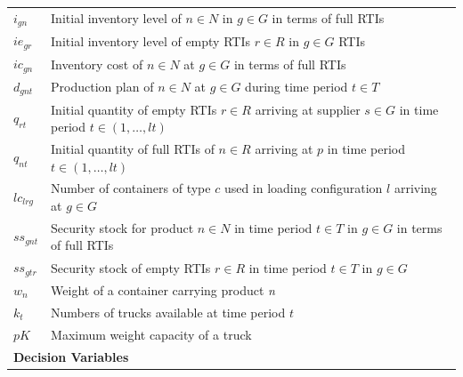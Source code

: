 \begin{longtable}[hbt!]{  |p{}|p{}  |}
  \textit{$i_{gn}$}  & Initial inventory level of $n\in N$ in $g \in G$ in terms of full RTIs                                                                            \\
  \textit{$ie_{gr}$} & Initial inventory level of empty RTIs $r\in R$ in $g \in G$ RTIs                                                                                  \\
  \textit{$ic_{gn}$} & Inventory cost of $n\in N$ at $g \in G$ in terms of full RTIs                                                                                     \\
  $d_{gnt}$          & Production plan of $n \in N$ at $g \in G$ during time period $t\in T$                                                                             \\
  $q_{rt}$           & Initial quantity of empty RTIs $r\in R$ arriving at supplier $s\in G$ in time period $t \in (1,\dots , lt)$                                       \\
  $q_{nt}$           & Initial quantity of full RTIs of $n \in R$ arriving at $p$ in time period $t \in (1,\dots , lt)$                                                  \\
  $lc_{lrg}$         & Number of containers of type $c$ used in loading configuration $l$ arriving at $g\in G$                                                           \\
  $ss_{gnt}$         & Security stock for product $n\in N$  in time period $t \in T$ in $g \in G$ in terms of full RTIs                                                  \\
  $ss_{gtr}$         & Security stock of empty RTIs $r\in R$  in time period $t \in T$ in $g \in G$                                                                      \\
  \textit{$w_{n}$}   & Weight of a container carrying product \textit{n}
  \\
  $k_t$              & Numbers of trucks available at time period $t$                                                                                                    \\
  \textit{$pK$}      & Maximum  weight capacity of a truck                                                                                                               \\ [0.15cm]
  \hline
  \multicolumn{2}{|l|}{\textbf{Decision Variables}}                                                                                                                      \\ \hline

\end{longtable}
